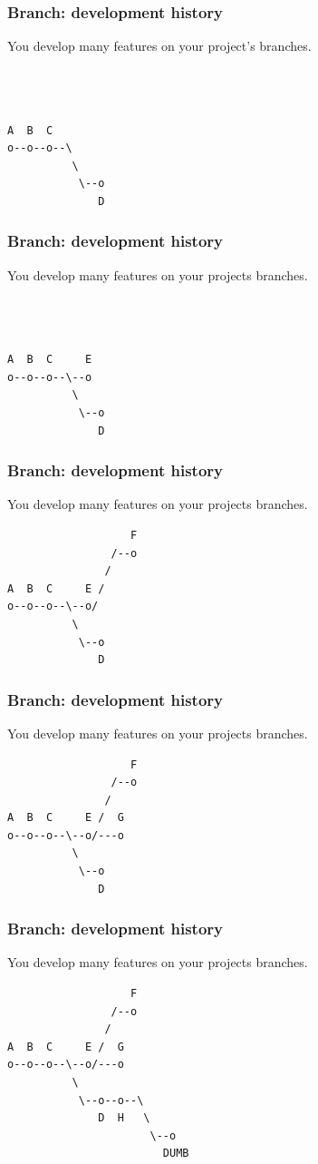 \documentclass[unknownkeysallowed]{beamer}
\begin{document}
\begin{frame}[fragile]
	\frametitle{Branch: development history}
	You develop many features on your project's branches.
\begin{verbatim}



A  B  C  
o--o--o--\
          \ 
           \--o
              D
\end{verbatim}
\end{frame}

\begin{frame}[fragile]
	\frametitle{Branch: development history}
	You develop many features on your projects branches.
\begin{verbatim}

             
              
A  B  C     E
o--o--o--\--o
          \ 
           \--o
              D  
\end{verbatim}
\end{frame}

\begin{frame}[fragile]
	\frametitle{Branch: development history}
	You develop many features on your projects branches.
\begin{verbatim}
                   F
                /--o
               /
A  B  C     E /
o--o--o--\--o/
          \ 
           \--o
              D  
\end{verbatim}
\end{frame}

\begin{frame}[fragile]
	\frametitle{Branch: development history}
	You develop many features on your projects branches.
\begin{verbatim}
                   F
                /--o
               /
A  B  C     E /  G
o--o--o--\--o/---o
          \ 
           \--o
              D  
\end{verbatim}
\end{frame}

\begin{frame}[fragile]
	\frametitle{Branch: development history}
	You develop many features on your projects branches.
\begin{verbatim}
                   F
                /--o
               /
A  B  C     E /  G
o--o--o--\--o/---o
          \ 
           \--o--o--\
              D  H   \
                      \--o
                        DUMB
\end{verbatim}
\end{frame}
\end{document}
